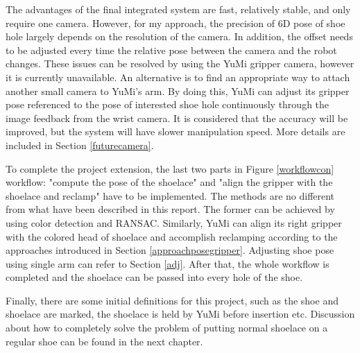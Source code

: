 The advantages of the final integrated system are fast, relatively stable, and only require one camera.  However, for my approach, the precision of 6D pose of shoe hole largely depends on the resolution of the camera. In addition, the offset needs to be adjusted every time the relative pose between the camera and the robot changes. These issues can be resolved by using the YuMi gripper camera, however it is currently unavailable. An alternative is to find an appropriate way to attach another small camera to YuMi's arm. By doing this, YuMi can adjust its gripper pose referenced to the pose of interested shoe hole continuously through the image feedback from the wrist camera. It is considered that the accuracy will be improved, but the system will have slower manipulation speed. More details are included in Section \ref{futurecamera}.

To complete the project extension, the last two parts in Figure \ref{workflowcon} workflow: "compute the pose of the shoelace" and "align the gripper with the shoelace and reclamp" have to be implemented. The methods are no different from what have been described in this report. The former can be achieved by using color detection and RANSAC. Similarly, YuMi can align its right gripper with the colored head of shoelace and accomplish reclamping according to the approaches introduced in Section \ref{approachposegripper}. Adjusting shoe pose using single arm can refer to Section \ref{adj}. After that, the whole workflow is completed and the shoelace can be passed into every hole of the shoe.

Finally, there are some initial definitions for this project, such as the shoe and shoelace are marked, the shoelace is held by YuMi before insertion etc. Discussion about how to completely solve the problem of putting normal shoelace on a regular shoe can be found in the next chapter. 


